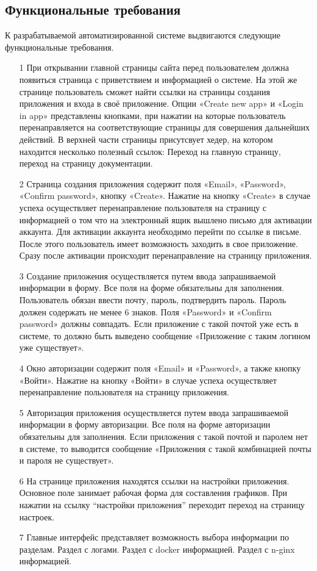 \subsection{Функциональные требования}

К разрабатываемой автоматизированной системе выдвигаются следующие функциональные требования.
\begin{enumerate}
\item[1] При открывании главной страницы сайта перед пользователем должна появиться страница с приветствием и информацией о системе. На этой же странице пользователь сможет найти ссылки на страницы создания приложения и входа в своё приложение.
Опции «Create new app» и «Login in app» представлены кнопками, при нажатии на которые пользователь перенаправляется на соответствующие страницы для совершения дальнейших действий. В верхней части страницы присутсвует хедер, на котором находится несколько полезный ссылок: Переход на главную страницу, переход на страницу документации.

\item[2] Страница создания приложения содержит поля «Email», «Password», «Confirm password», кнопку «Create».
Нажатие на кнопку «Create» в случае успеха осуществляет перенаправление пользователя на страницу с информацией о том что на электронный ящик вышлено письмо для активации аккаунта.
Для активации аккаунта необходимо перейти по ссылке в письме. После этого пользователь имеет возможность заходить в свое приложение.
Сразу после активации происходит перенаправление на страницу приложения.

\item[3] Создание приложения осуществляется путем ввода запрашиваемой информации в форму.
Все поля на форме обязательны для заполнения.
Пользователь обязан ввести почту, пароль, подтвердить пароль.
Пароль должен содержать не менее 6 знаков.
Поля «Password» и «Confirm password» должны совпадать.
Если приложение с такой почтой уже есть в системе, то должно быть выведено сообщение «Приложение с таким логином уже существует».

\item[4] Окно авторизации содержит поля «Email» и «Password», а также кнопку «Войти».
Нажатие на кнопку «Войти» в случае успеха осуществляет перенаправление пользователя на страницу приложения.

\item[5] Авторизация приложения осуществляется путем ввода запрашиваемой информации в форму авторизации.
Все поля на форме авторизации обязательны для заполнения.
Если приложения с такой почтой и паролем нет в системе, то выводится сообщение «Приложения с такой комбинацией почты и пароля не существует».
 
\item[6] На странице приложения находятся ссылки на настройки приложения. Основное поле занимает рабочая форма для составления графиков.
При нажатии на ссылку “настройки приложения” переходит переход на страницу настроек.


\item[7] Главные интерфейс представляет возможность выбора информации по разделам. 
Раздел с логами.
Раздел с docker информацией.
Раздел с n-ginx информацией.

\end{enumerate}